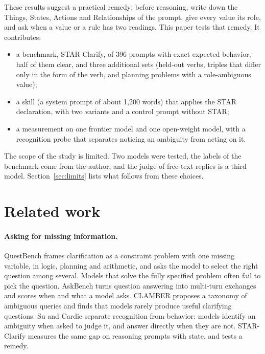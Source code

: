 \documentclass[11pt,a4paper]{article}
\begin{document}
These results suggest a practical remedy: before reasoning, write down the
Things, States, Actions and Relationships of the prompt, give every value
its role, and ask when a value or a rule has two readings. This paper
tests that remedy. It contributes:

\begin{itemize}\setlength\itemsep{2pt}
\item a benchmark, STAR-Clarify, of 396 prompts with exact expected
behavior, half of them clear, and three additional sets (held-out verbs,
triples that differ only in the form of the verb, and planning problems
with a role-ambiguous value);
\item a skill (a system prompt of about 1,200 words) that applies the STAR
declaration, with two variants and a control prompt without STAR;
\item a measurement on one frontier model and one open-weight model, with
a recognition probe that separates noticing an ambiguity from acting on
it.
\end{itemize}

The scope of the study is limited. Two models were tested, the labels of
the benchmark come from the author, and the judge of free-text replies is
a third model. Section~\ref{sec:limits} lists what follows from these
choices.

\section{Related work}

\paragraph{Asking for missing information.}
QuestBench \cite{li2025questbench} frames clarification as a constraint
problem with one missing variable, in logic, planning and arithmetic, and
asks the model to select the right question among several. Models that
solve the fully specified problem often fail to pick the question.
AskBench \cite{zhao2026askbench} turns question answering into multi-turn
exchanges and scores when and what a model asks. CLAMBER
\cite{zhang2024clamber} proposes a taxonomy of ambiguous queries and finds
that models rarely produce useful clarifying questions. Su and Cardie
\cite{su2026knowing} separate recognition from behavior: models identify
an ambiguity when asked to judge it, and answer directly when they are
not. STAR-Clarify measures the same gap on reasoning prompts with state,
and tests a remedy.
\end{document}
